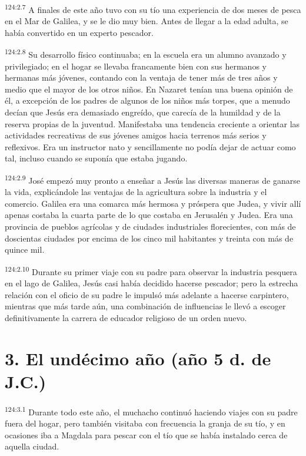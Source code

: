 \par
\textsuperscript{124:2.7} A finales de este año tuvo con su tío una experiencia de dos meses de pesca en el Mar de Galilea, y se le dio muy bien. Antes de llegar a la edad adulta, se había convertido en un experto pescador.

\par
\textsuperscript{124:2.8} Su desarrollo físico continuaba; en la escuela era un alumno avanzado y privilegiado; en el hogar se llevaba francamente bien con sus hermanos y hermanas más jóvenes, contando con la ventaja de tener más de tres años y medio que el mayor de los otros niños. En Nazaret tenían una buena opinión de él, a excepción de los padres de algunos de los niños más torpes, que a menudo decían que Jesús era demasiado engreído, que carecía de la humildad y de la reserva propias de la juventud. Manifestaba una tendencia creciente a orientar las actividades recreativas de sus jóvenes amigos hacia terrenos más serios y reflexivos. Era un instructor nato y sencillamente no podía dejar de actuar como tal, incluso cuando se suponía que estaba jugando.

\par
\textsuperscript{124:2.9} José empezó muy pronto a enseñar a Jesús las diversas maneras de ganarse la vida, explicándole las ventajas de la agricultura sobre la industria y el comercio. Galilea era una comarca más hermosa y próspera que Judea, y vivir allí apenas costaba la cuarta parte de lo que costaba en Jerusalén y Judea. Era una provincia de pueblos agrícolas y de ciudades industriales florecientes, con más de doscientas ciudades por encima de los cinco mil habitantes y treinta con más de quince mil.

\par
\textsuperscript{124:2.10} Durante su primer viaje con su padre para observar la industria pesquera en el lago de Galilea, Jesús casi había decidido hacerse pescador; pero la estrecha relación con el oficio de su padre le impulsó más adelante a hacerse carpintero, mientras que más tarde aún, una combinación de influencias le llevó a escoger definitivamente la carrera de educador religioso de un orden nuevo.

\section*{3. El undécimo año (año 5 d. de J.C.)}
\par
\textsuperscript{124:3.1} Durante todo este año, el muchacho continuó haciendo viajes con su padre fuera del hogar, pero también visitaba con frecuencia la granja de su tío, y en ocasiones iba a Magdala para pescar con el tío que se había instalado cerca de aquella ciudad.


